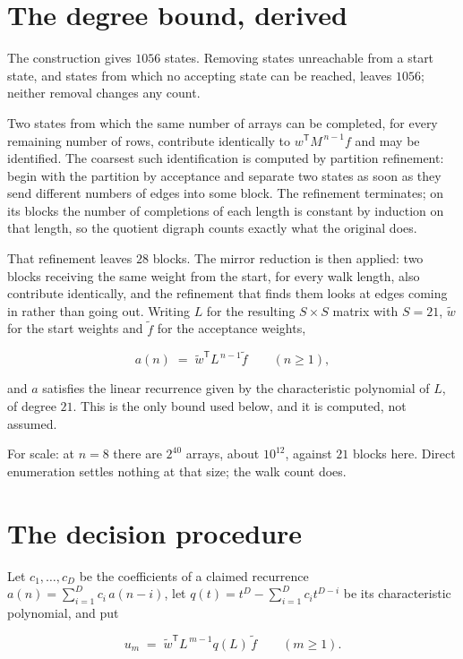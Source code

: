 \documentclass[11pt]{article}
\theoremstyle{definition}
\begin{document}
\section{The degree bound, derived}

The construction gives $1056$ states. Removing states unreachable from a start state, and states from which no accepting state can be reached, leaves $1056$; neither removal changes any count.

Two states from which the same number of arrays can be completed, for every remaining number of rows, contribute identically to $w^{\mathsf T}M^{\,n-1}f$ and may be identified. The coarsest such identification is computed by partition refinement: begin with the partition by acceptance and separate two states as soon as they send different numbers of edges into some block. The refinement terminates; on its blocks the number of completions of each length is constant by induction on that length, so the quotient digraph counts exactly what the original does.

That refinement leaves $28$ blocks. The mirror reduction is then applied: two blocks receiving the same weight from the start, for every walk length, also contribute identically, and the refinement that finds them looks at edges coming in rather than going out. Writing $L$ for the resulting $S \times S$ matrix with $S = 21$, $\tilde w$ for the start weights and $\tilde f$ for the acceptance weights,

\[a(n) \;=\; \tilde w^{\mathsf T} L^{\,n-1} \tilde f \qquad (n \ge 1),\]

and $a$ satisfies the linear recurrence given by the characteristic polynomial of $L$, of degree $21$. This is the only bound used below, and it is computed, not assumed.

For scale: at $n = 8$ there are $2^{40}$ arrays, about $10^{12}$, against $21$ blocks here. Direct enumeration settles nothing at that size; the walk count does.

\section{The decision procedure}

Let $c_1,\dots,c_D$ be the coefficients of a claimed recurrence $a(n) = \sum_{i=1}^{D} c_i\,a(n-i)$, let $q(t) = t^{D} - \sum_{i=1}^{D} c_i t^{D-i}$ be its characteristic polynomial, and put

\[u_m \;=\; \tilde w^{\mathsf T} L^{\,m-1} q(L)\,\tilde f \qquad (m \ge 1).\]
\end{document}
